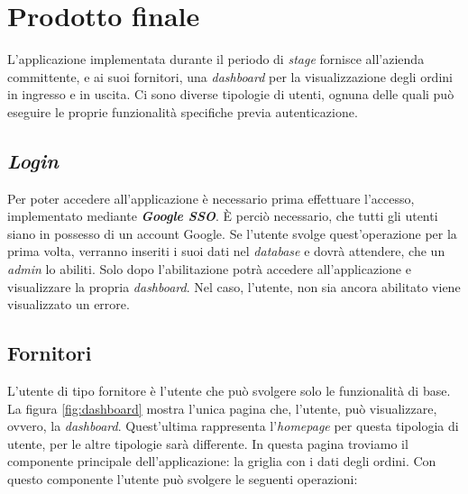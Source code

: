 \section{Prodotto finale}
L'applicazione implementata durante il periodo di \emph{stage} fornisce all'azienda committente, e ai suoi fornitori, una \emph{dashboard} per la visualizzazione degli ordini in ingresso e in uscita.
Ci sono diverse tipologie di utenti, ognuna delle quali può eseguire le proprie funzionalità specifiche previa autenticazione. 

\subsection{\emph{Login}}
Per poter accedere all'applicazione è necessario prima effettuare l'accesso, implementato mediante \emph{\textbf{Google SSO}}. 
È perciò necessario, che tutti gli utenti siano in possesso di un account Google.
Se l'utente svolge quest'operazione per la prima volta, verranno inseriti i suoi dati nel \emph{database} e dovrà attendere, che un \emph{admin} lo abiliti.
Solo dopo l'abilitazione potrà accedere all'applicazione e visualizzare la propria \emph{dashboard}. 
Nel caso, l'utente, non sia ancora abilitato viene visualizzato un errore.

\subsection{Fornitori}
L'utente di tipo fornitore è l'utente che può svolgere solo le funzionalità di base.
La figura \ref{fig:dashboard} mostra l'unica pagina che, l'utente, può visualizzare, ovvero, la \emph{dashboard}.
Quest'ultima rappresenta l'\emph{homepage} per questa tipologia di utente, per le altre tipologie sarà differente.
In questa pagina troviamo il componente principale dell'applicazione: la griglia con i dati degli ordini.
Con questo componente l'utente può svolgere le seguenti operazioni:


